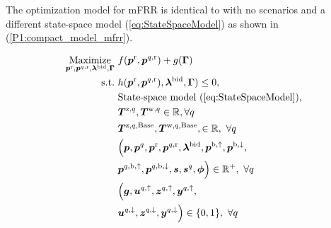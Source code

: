 \documentclass[lettersize,journal]{IEEEtran}
\begin{document}
The optimization model for mFRR is identical to \cite{gade2023load} with no scenarios and a different state-space model (\ref{eq:StateSpaceModel}) as shown in (\ref{P1:compact_model_mfrr}).

\begin{subequations}\label{P1:compact_model_mfrr}
    \begin{align}
        \underset{\bm{p}^{\rm{r}}, \bm{p}^{q,\rm{r}}, \bm{\lambda}^{\rm{bid}}, \bm{\Gamma}}{\text{Maximize}} \  & f(\bm{p}^{\rm{r}}, \bm{p}^{q,\rm{r}}) + g(\bm{\Gamma}) \label{P1:eq1_mfrr}
        \\
        \text{s.t.} \                                                                                           & h(\bm{p}^{\rm{r}}, \bm{p}^{q,\rm{r}}), \bm{\lambda}^{\rm{bid}}, \bm{\Gamma}) \leq 0, \label{P1:eq2_mfrr}                                             \\
        \                                                                                                       & \text{State-space model } (\ref{eq:StateSpaceModel}),  \label{P1:eq3_mfrr}
        \\
        \                                                                                                       & \bm{T}^{\text{z},q}, \bm{T}^{\text{w},q} \in \mathbb{R}, \forall{q} \label{P1:eq4_mfrr}
        \\
        \                                                                                                       & \bm{T}^{\text{z},q,\text{Base}}, \bm{T}^{\text{w},q,\text{Base}}, \in \mathbb{R}, \ \forall{q} \label{P1:eq5_mfrr}
        \\
        \                                                                                                       & \Bigl( \bm{p}, \bm{p}^{q}, \bm{p}^{\rm{r}}, \bm{p}^{q,\rm{r}}, \bm{\lambda}^{\rm{bid}}, \bm{p}^{\rm{b},\uparrow}, \bm{p}^{\rm{b},\downarrow}, \notag \\ & \bm{p}^{q,\rm{b},\uparrow}, \bm{p}^{q,\rm{b},\downarrow}, \bm{s}, \bm{s}^{q}, \bm{\phi} \Bigr) \in \mathbb{R}^{+}, \ \forall{q}  \label{P1:eq6_mfrr}
        \\
        \                                                                                                       & \Bigl( \bm{g}, \bm{u}^{q,\uparrow}, \bm{z}^{q,\uparrow}, \bm{y}^{q,\uparrow}, \notag                                                                 \\ & \bm{u}^{q,\downarrow}, \bm{z}^{q,\downarrow}, \bm{y}^{q,\downarrow} \Bigr) \in \{0,1\}, \ \forall{q} \label{P1:eq7_mfrr}
    \end{align}
\end{subequations}
\end{document}

